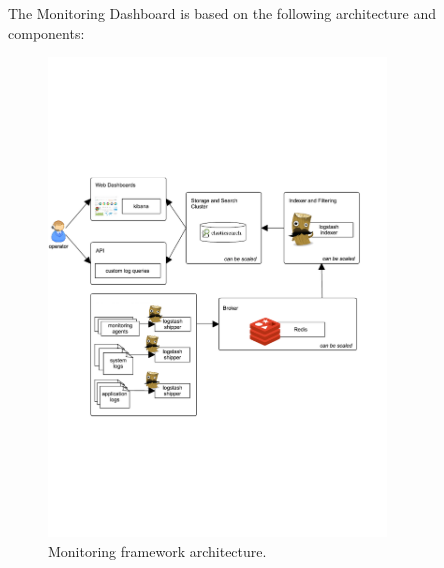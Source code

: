 The Monitoring Dashboard is based on the following architecture and components:


\begin{figure}[!hbt]
\centering
\includegraphics[width=0.8\textwidth]{figs/monitoring.pdf}
\caption{Monitoring framework architecture.}
\end{figure}

